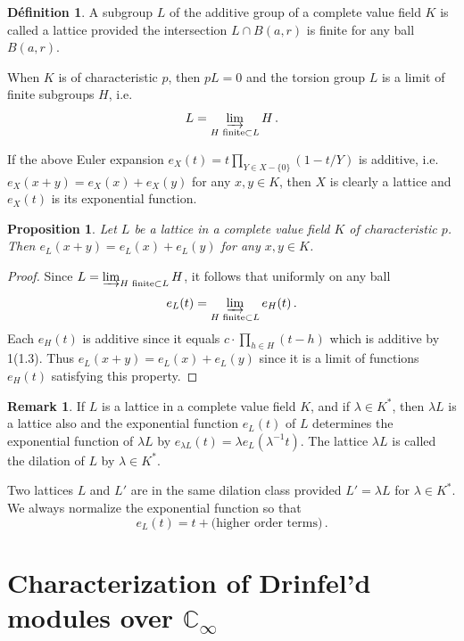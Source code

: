 \documentclass[12pt,a4paper]{article}
\theoremstyle{plain}
\newtheorem{proposition}{Proposition}[section]
\theoremstyle{definition}
\newtheorem{definition}{D\'efinition}[section]
\newtheorem{remark}{Remark}[section]
\theoremstyle{remark}
\begin{document}
\begin{definition}
A subgroup $L$ of the additive group of a complete value field $K$ is called 
a lattice provided the intersection $L \cap B(a,r)$ is finite for any ball 
$B(a,r)$.
\end{definition}

When $K$ is of characteristic $p$, then $pL = 0$ and the torsion group $L$ is 
a limit of finite subgroups $H$, i.e.
\[
L = \varinjlim_{H \text{ finite} \subset L} H \,.
\]

If the above Euler expansion $e_X(t) = t \prod_{Y \in X - \{0\}}(1 - t/Y)$ is 
additive, i.e. $e_X(x+y) = e_X(x) + e_X(y)$ for any $x,y \in K$, then $X$ is 
clearly a lattice and $e_X(t)$ is its exponential function.

\begin{proposition}
Let $L$ be a lattice in a complete value field $K$ of characteristic $p$. 
Then $e_L(x+y) = e_L(x) + e_L(y)$ for any $x, y \in K$.
\end{proposition}

\begin{proof}
Since $L = \varinjlim_{H \text{ finite} \subset L} H$, it follows that uniformly 
on any ball
\[
e_L(t) = \varinjlim_{H \text{ finite} \subset L} e_H(t) \,.
\]
Each $e_H(t)$ is additive since it equals $c \cdot \prod_{h \in H}(t-h)$ which 
is additive by 1(1.3). Thus $e_L(x+y) = e_L(x) + e_L(y)$ since it is a limit 
of functions $e_H(t)$ satisfying this property.
\end{proof}

\begin{remark}
If $L$ is a lattice in a complete value field $K$, and if $\lambda \in K^*$, 
then $\lambda L$ is a lattice also and the exponential function $e_L(t)$ of $L$ 
determines the exponential function of $\lambda L$ by 
$e_{\lambda L}(t) = \lambda e_L(\lambda^{-1}t)$. The lattice $\lambda L$ is 
called the dilation of $L$ by $\lambda \in K^*$.

Two lattices $L$ and $L'$ are in the same dilation class provided $L' = \lambda L$ 
for $\lambda \in K^*$. We always normalize the exponential function so that
\[
e_L(t) = t + \text{(higher order terms)} \,.
\]
\end{remark}


\section{Characterization of Drinfel'd modules over $\mathbb{C}_\infty$}
\end{document}
